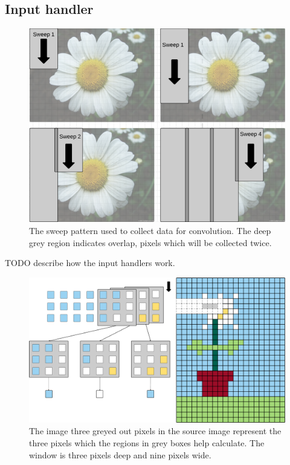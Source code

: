\begin{Description}
\subsection{Input handler}
\begin{figure}[h!]
    \includegraphics[width=\linewidth]{img/Sweeps.png}
    \caption{The sweep pattern used to collect data for convolution. The deep grey region indicates overlap, pixels which will be collected twice.}
    \label{fig:Sweeps}
\end{figure}
TODO describe how the input handlers work.

\begin{figure}[h!]
    \includegraphics[width=\linewidth]{img/FeedPattern.png}
    \caption{The image three greyed out pixels in the source image represent the three pixels which the regions in grey boxes help calculate. The window is three pixels deep and nine pixels wide.}
    \label{fig:SweepFrontier}
\end{figure}


\end{Description}

